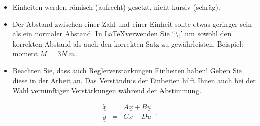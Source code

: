 \begin{itemize}
\item Einheiten werden römisch (aufrecht) gesetzt, nicht kursiv (schräg).

\item Der Abstand zwischen einer Zahl und einer Einheit sollte etwas geringer sein als ein normaler Abstand. In \LaTeX verwenden Sie ``\textbackslash,' um sowohl den korrekten Abstand als auch den korrekten Satz zu gewährleisten. 
Beispiel: moment $M=\,{3}{N.m}$.%

\item Beachten Sie, dass auch Reglerverstärkungen Einheiten haben! Geben Sie diese in der Arbeit an. Das Verständnis der Einheiten hilft Ihnen auch bei der Wahl vernünftiger Verstärkungen während der Abstimmung.



\end{itemize}


\begin{equation}
\begin{array}{rcl}
\underline{\dot{x}} & = & A\underline{x} + B\underline{u}\\
\underline{y} & = & C\underline{x} + D\underline{u}
\end{array}\,.
\label{eq:linear}
\end{equation}